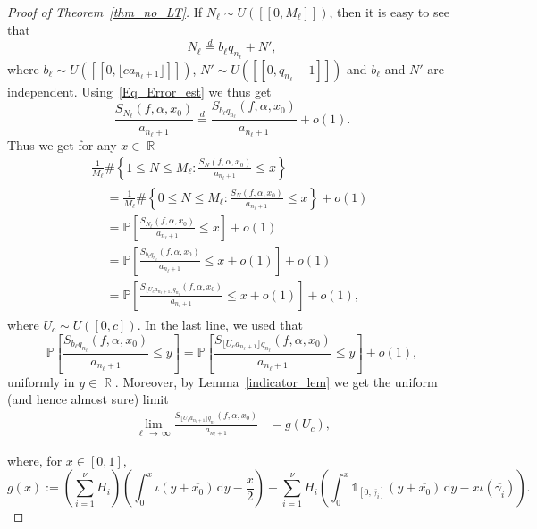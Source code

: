 \documentclass[10pt,a4paper]{amsart}
\numberwithin{equation}{section}
\DeclareMathOperator{\R}{\mathbb{R}}
\newcommand{\bbP}{\mathbb{P}}
\newcommand{\rmd}{\mathrm{d}}
\newcommand{\kj}{n_{\ell}}
\theoremstyle{definition}
\begin{document}
\begin{proof}[Proof of Theorem~\ref{thm_no_LT}]
If $N_{\ell} \sim U([\![0, M_{\ell}]\!])$, then it is easy to see that
\begin{equation*}
N_{\ell } \stackrel{d}{=} b_{\ell}q_{n_{\ell}} +N',
\end{equation*}
where $b_{\ell} \sim U([\![0,\lfloor ca_{n_{\ell}+1}\rfloor]\!])$, $N' \sim U([\![0,q_{n_{\ell}}-1]\!])$ and $b_{\ell}$ and $N'$ are independent. Using~\eqref{Eq_Error_est} we thus get
\begin{equation*}
\frac{S_{N_\ell}(f, \alpha, x_0)}{a_{\kj +1}} \stackrel{d}{=} \frac{S_{b_\ell q_{\kj }}(f, \alpha, x_0)}{a_{\kj +1}} + o(1).
\end{equation*}
Thus we get for any $x \in \R$
\begin{multline*}
\frac{1}{M_{\ell}} \# \left \{ 1 \leq N \leq M_{\ell} : \frac{S_N(f, \alpha, x_0)}{a_{n_{\ell}+1}} \leq x \right \}\\
\begin{aligned}
&= \frac{1}{M_{\ell}} \# \left \{ 0 \leq N \leq M_{\ell} : \frac{S_N(f, \alpha, x_0)}{a_{n_{\ell}+1}} \leq x \right \} + o(1)
\\& = \bbP \left[\frac{S_{N_\ell}(f, \alpha, x_0)}{a_{n_\ell +1}} \leq x \right] + o(1) \\
&= \bbP \left[\frac{S_{b_\ell q_{\kj }}(f, \alpha, x_0)}{a_{n_\ell +1}} \leq x + o(1)\right] + o(1) \\
&= \bbP \left[\frac{S_{ \lfloor U_c a_{\kj +1} \rfloor q_{\kj }}(f, \alpha, x_0)}{a_{n_\ell +1}} \leq x + o(1)\right] + o(1),
\end{aligned}
\end{multline*}
where $U_c \sim U([0,c])$. In the last line, we used that
\[
\bbP \left[\frac{S_{b_\ell q_{\kj }}(f, \alpha, x_0)}{a_{n_\ell +1}} \leq y \right] = \bbP \left[\frac{S_{\lfloor U_c a_{\kj +1} \rfloor q_{\kj }}(f, \alpha, x_0)}{a_{n_\ell +1}} \leq y \right] + o(1),
\]
uniformly in $y \in \R$. Moreover, by Lemma~\ref{indicator_lem} we get the uniform (and hence almost sure) limit
\begin{align*}
\lim_{\ell\,\to\,\infty} \frac{S_{ \lfloor U_c a_{n_{\ell}+1} \rfloor q_{n_{\ell}} }(f, \alpha, x_0) }{a_{n_\ell +1}} &= g(U_c),
\end{align*}

where, for $x \in [0,1]$,
\[
g(x) :=
\left(\sum_{i = 1}^{\nu} H_i\right)\left(\int_{0}^{x} \iota(y + \overline{x_0}) \, \rmd y - \frac{x}{2}\right) + \sum_{i = 1}^{\nu} H_i\left(\int_{0}^{x} \mathds{1}_{\left[0, \overline{\gamma_i}\right]}\left(y + \overline{x_0}\right) \,\rmd y - x\iota(\overline{\gamma_i})\right).
\]


\end{proof}
\end{document}
